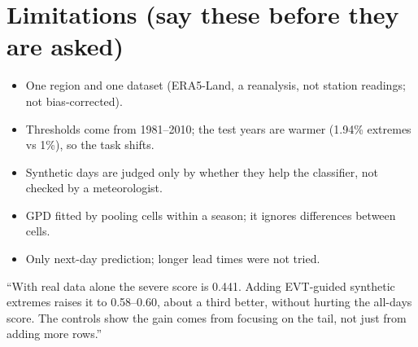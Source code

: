 \section{Limitations (say these before they are asked)}
\begin{itemize}
  \item One region and one dataset (ERA5-Land, a reanalysis, not station readings; not bias-corrected).
  \item Thresholds come from 1981--2010; the test years are warmer (1.94\% extremes vs 1\%), so the task shifts.
  \item Synthetic days are judged only by whether they help the classifier, not checked by a meteorologist.
  \item GPD fitted by pooling cells within a season; it ignores differences between cells.
  \item Only next-day prediction; longer lead times were not tried.
\end{itemize}

\begin{sayit}
``With real data alone the severe score is 0.441. Adding EVT-guided synthetic extremes raises it to 0.58--0.60, about
a third better, without hurting the all-days score. The controls show the gain comes from focusing on the tail, not
just from adding more rows.''
\end{sayit}
